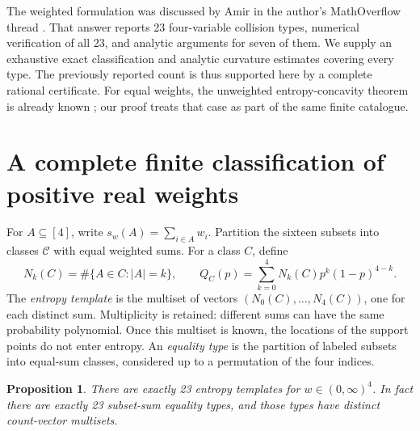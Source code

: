 \documentclass[11pt,a4paper]{article}
\newtheorem{proposition}[theorem]{Proposition}
\newcommand{\calC}{\mathcal{C}}
\begin{document}
The weighted formulation was discussed by Amir in the author's
MathOverflow thread \cite{amir}. That answer reports 23 four-variable
collision types, numerical verification of all 23, and analytic arguments
for seven of them. We supply an exhaustive exact classification and
analytic curvature estimates covering every type. The previously
reported count is thus supported here by a complete rational certificate.
For equal weights, the unweighted entropy-concavity theorem is
already known \cite{hillion-johnson}; our proof treats that case as
part of the same finite catalogue.

\section{A complete finite classification of positive real weights}
For \(A\subseteq[4]\), write \(s_w(A)=\sum_{i\in A}w_i\).
Partition the sixteen subsets into classes \(\calC\) with equal
weighted sums. For a class \(C\), define
\[
 N_k(C)=\#\{A\in C:|A|=k\},\qquad
 Q_C(p)=\sum_{k=0}^4 N_k(C)p^k(1-p)^{4-k}.
\]
The \emph{entropy template} is the multiset of vectors
\((N_0(C),\ldots,N_4(C))\), one for each distinct sum. Multiplicity is
retained: different sums can have the same probability polynomial.
Once this multiset is known, the locations of the support points do
not enter entropy. An \emph{equality type} is the partition of labeled
subsets into equal-sum classes, considered up to a permutation of the
four indices.

\begin{proposition}\label{prop:classification}
There are exactly 23 entropy templates for \(w\in(0,\infty)^4\).
In fact there are exactly 23 subset-sum equality types, and those
types have distinct count-vector multisets.
\end{proposition}
\end{document}
